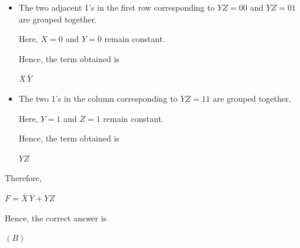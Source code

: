 \documentclass[12pt]{article}
\begin{document}
\begin{itemize}

\item The two adjacent 1's in the first row corresponding to 
$YZ=00$ and $YZ=01$ are grouped together.

Here, $X=0$ and $Y=0$ remain constant.

Hence, the term obtained is

$
\overline{X}\,\overline{Y}
$

\item The two 1's in the column corresponding to 
$YZ=11$ are grouped together.

Here, $Y=1$ and $Z=1$ remain constant.

Hence, the term obtained is

$
YZ
$

\end{itemize}

Therefore,

$
F=\overline{X}\,\overline{Y}+YZ
$

Hence, the correct answer is

$
\boxed{(B)}
$
\end{document}
